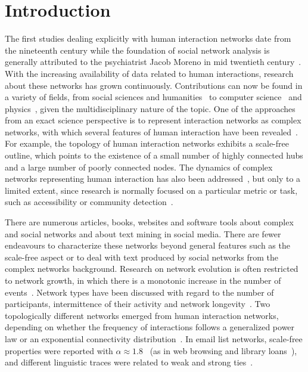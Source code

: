 \chapter{Introduction}\label{ch:int}
The first studies dealing explicitly with human interaction networks
date from the nineteenth century while the foundation of
social network analysis is generally attributed to the psychiatrist Jacob Moreno in mid twentieth century~\cite{moreno,newmanBook}.
With the increasing availability of data related to human interactions, research about these networks has grown continuously.
Contributions can now be found in a variety of fields, from social sciences and humanities~\cite{latour2013} to computer science~\cite{bird} and physics~\cite{barabasiHumanDyn,newmanFriendship}, given the multidisciplinary nature of the topic.
One of the approaches from an exact science perspective is to represent interaction networks as complex networks, with which 
several features of human interaction have been revealed~\cite{barabasiHumanDyn,newmanFriendship}.
For example, the topology of human interaction networks exhibits a scale-free outline,
which points to the existence of a small number of highly connected hubs and a large number of poorly connected nodes.
The dynamics of complex networks representing human interaction has also been addressed~\cite{barabasiEvo,newmanEvolving}, but only to a limited extent, since research is normally focused on a particular metric or task, such as accessibility or community detection~\cite{access,newmanModularity}. 

There are numerous articles, books, websites and software tools about complex and social networks and about text mining in social media.
There are fewer endeavours to characterize these networks beyond general features such as the scale-free 
aspect or to deal with text produced by social networks from the complex networks background.
Research on network evolution is often restricted to network growth, in which there is a monotonic increase in the number of events~\cite{barabasiEvo}.
Network types have been discussed with regard to the number of participants, intermittence of their activity and network longevity~\cite{barabasiEvo}. Two topologically different networks emerged from human interaction networks, depending on whether the frequency of interactions follows a generalized power law or an exponential connectivity distribution~\cite{barabasiTopologicalEv}. In email list networks, scale-free properties were reported with $\alpha \approx 1.8$~\cite{bird} (as in web browsing and library loans~\cite{barabasiHumanDyn}), and different linguistic traces were related to weak and strong ties~\cite{Gmane2}.

